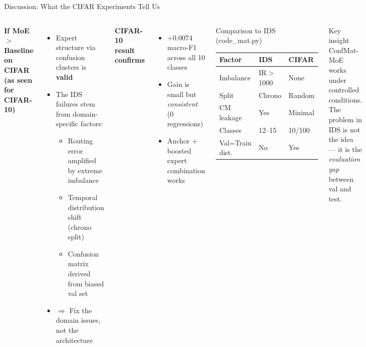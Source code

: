 \documentclass[aspectratio=169,10pt]{beamer}
\begin{document}
\begin{frame}{Discussion: What the CIFAR Experiments Tell Us}
  \begin{columns}[T]
      \textbf{If MoE $>$ Baseline on CIFAR (as seen for CIFAR-10)}
      \begin{itemize}\itemsep3pt
        \item Expert structure via confusion clusters is \textbf{valid}
        \item The IDS failures stem from domain-specific factors:
          \begin{itemize}
            \item Routing error amplified by extreme imbalance
            \item Temporal distribution shift (chrono split)
            \item Confusion matrix derived from biased val set
          \end{itemize}
        \item $\Rightarrow$ Fix the domain issues, not the architecture
      \end{itemize}
      \vspace{6pt}
      \textbf{CIFAR-10 result confirms}
      \begin{itemize}\itemsep3pt
        \item +0.0074 macro-F1 across all 10 classes
        \item Gain is small but \emph{consistent} (0 regressions)
        \item Anchor + boosted expert combination works
      \end{itemize}
      \begin{block}{Comparison to IDS (code\_mat.py)}
        \footnotesize
        \renewcommand{\arraystretch}{1.2}
        \begin{tabular}{lll}
          \toprule
          Factor & IDS & CIFAR \\
          \midrule
          Imbalance       & IR$>$1000 & None \\
          Split           & Chrono    & Random \\
          CM leakage      & Yes       & Minimal \\
          Classes         & 12--15    & 10/100 \\
          Val=Train dist. & No        & Yes \\
          \bottomrule
        \end{tabular}
      \end{block}
      \vspace{6pt}
      \begin{alertblock}{Key insight}
        \small
        ConfMat-MoE works under controlled conditions.
        The problem in IDS is not the idea ---
        it is the \emph{evaluation gap} between val and test.
      \end{alertblock}
  \end{columns}
\end{frame}
\end{document}
